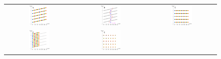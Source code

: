 \documentclass{article}
\begin{document}
\begin{figure}
	\centering
	\begin{tabular}{ccc}
		\includegraphics[width=0.32\textwidth]{plots/shift1.pdf} &
		\includegraphics[width=0.32\textwidth]{plots/shift2.pdf} &
		\includegraphics[width=0.32\textwidth]{plots/shift3.pdf} \\
		\includegraphics[width=0.32\textwidth]{plots/shift6.pdf} &
		\includegraphics[width=0.32\textwidth]{plots/shift5.pdf} &

\end{tabular}
\end{figure}
\end{document}
